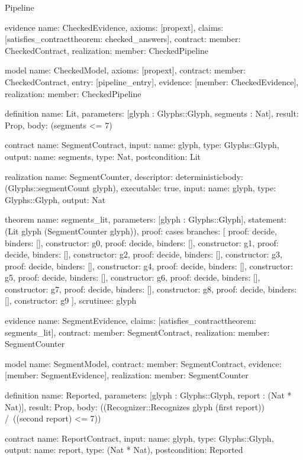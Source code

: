\begin{lexlean}{Pipeline}
\begin{semanticmodule}
evidence{
  name: CheckedEvidence,
  axioms: [propext],
  claims: [satisfies_contract{theorem: checked_answers}],
  contract: {member: CheckedContract},
  realization: {member: CheckedPipeline}
}

model{
  name: CheckedModel,
  axioms: [propext],
  contract: {member: CheckedContract},
  entry: [pipeline_entry],
  evidence: [{member: CheckedEvidence}],
  realization: {member: CheckedPipeline}
}

definition{
  name: Lit,
  parameters: [glyph : Glyphs::Glyph, segments : Nat],
  result: Prop,
  body: (segments <= 7)
}

contract{
  name: SegmentContract,
  input: {name: glyph, type: Glyphs::Glyph},
  output: {name: segments, type: Nat},
  postcondition: Lit
}

realization{
  name: SegmentCounter,
  descriptor: deterministic{body: (Glyphs::segmentCount glyph)},
  executable: true,
  input: {name: glyph, type: Glyphs::Glyph},
  output: Nat
}

theorem{
  name: segments_lit,
  parameters: [glyph : Glyphs::Glyph],
  statement: (Lit glyph (SegmentCounter glyph)),
  proof: cases{
    branches: [
      {proof: decide{}, binders: [], constructor: g0},
      {proof: decide{}, binders: [], constructor: g1},
      {proof: decide{}, binders: [], constructor: g2},
      {proof: decide{}, binders: [], constructor: g3},
      {proof: decide{}, binders: [], constructor: g4},
      {proof: decide{}, binders: [], constructor: g5},
      {proof: decide{}, binders: [], constructor: g6},
      {proof: decide{}, binders: [], constructor: g7},
      {proof: decide{}, binders: [], constructor: g8},
      {proof: decide{}, binders: [], constructor: g9}
    ],
    scrutinee: glyph
  }
}

evidence{
  name: SegmentEvidence,
  claims: [satisfies_contract{theorem: segments_lit}],
  contract: {member: SegmentContract},
  realization: {member: SegmentCounter}
}

model{
  name: SegmentModel,
  contract: {member: SegmentContract},
  evidence: [{member: SegmentEvidence}],
  realization: {member: SegmentCounter}
}

definition{
  name: Reported,
  parameters: [glyph : Glyphs::Glyph, report : (Nat * Nat)],
  result: Prop,
  body: ((Recognizer::Recognizes glyph (first report)) /\ ((second report) <= 7))
}

contract{
  name: ReportContract,
  input: {name: glyph, type: Glyphs::Glyph},
  output: {name: report, type: (Nat * Nat)},
  postcondition: Reported
}


\end{semanticmodule}
\end{lexlean}
